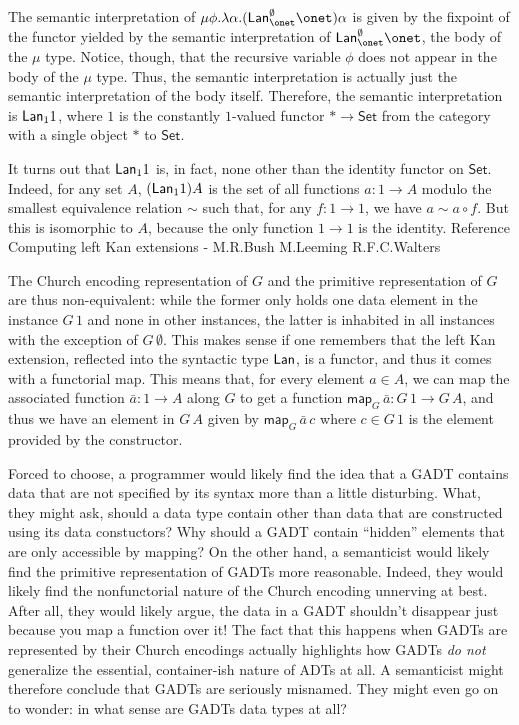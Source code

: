 \documentclass[acmsmall,screen,review,anonymous]{acmart}
\theoremstyle{definition}
\newcommand{\set}{\mathsf{Set}}
\newcommand{\map}{\mathsf{map}}
\begin{document}
\begin{example}
The semantic interpretation of $\mu \phi. \lambda
\alpha. (\Lan^{\emptyset}_{\onet} \onet)\alpha$ is given by the
fixpoint of the functor yielded by the semantic interpretation of
$\Lan^{\emptyset}_{\onet} \onet$, the body of the $\mu$ type.  Notice,
though, that the recursive variable $\phi$ does not appear in the body
of the $\mu$ type.  Thus, the semantic interpretation is actually just
the semantic interpretation of the body itself.  Therefore, the
semantic interpretation is $\mathsf{\mathsf{Lan}}_1 1$, where $1$ is the
constantly $1$-valued functor $\ast \to \set$ from the category with a
single object $\ast$ to $\set$.

It turns out that $\mathsf{\mathsf{Lan}}_1 1$ is, in fact, none other than the
identity functor on $\set$.  Indeed, for any set $A$,
$(\mathsf{\mathsf{Lan}}_1 1) A$ is the set of all functions $a : 1 \to A$
modulo the smallest equivalence relation $\sim$ such that, for any $f
: 1 \to 1$, we have $a \sim a \circ f$.  But this is isomorphic to
$A$, because the only function $1 \to 1$ is the identity.
{\color{blue} Reference Computing left Kan extensions - M.R.Bush
  M.Leeming R.F.C.Walters}

The Church encoding representation of $G$ and the primitive
representation of $G$ are thus non-equivalent: while the former only
holds one data element in the instance $G\,1$ and none in other
instances, the latter is inhabited in all instances with the exception
of $G\,\emptyset$.  This makes sense if one remembers that the left
Kan extension, reflected into the syntactic type $\mathsf{Lan}$, is a functor,
and thus it comes with a functorial map.  This means that, for every
element $a \in A$, we can map the associated function $\bar{a} : 1 \to
A$ along $G$ to get a function $\map_{G}\,\bar{a} : G\,1 \to G\,A$,
and thus we have an element in $G\,A$ given by $\map_{G}\,\bar{a}\, c$
where $c \in G\,1$ is the element provided by the constructor.
\end{example}

Forced to choose, a programmer would likely find the idea that a GADT
contains data that are not specified by its syntax more than a little
disturbing. What, they might ask, should a data type contain other
than data that are constructed using its data constuctors? Why should
a GADT contain ``hidden'' elements that are only accessible by
mapping? On the other hand, a semanticist would likely find the
primitive representation of GADTs more reasonable. Indeed, they would
likely find the nonfunctorial nature of the Church encoding unnerving
at best. After all, they would likely argue, the data in a GADT
shouldn't disappear just because you map a function over it! The fact
that this happens when GADTs are represented by their Church encodings
actually highlights how GADTs {\em do not} generalize the essential,
container-ish nature of ADTs at all. A semanticist might therefore
conclude that GADTs are seriously misnamed. They might even go on to
wonder: in what sense are GADTs data types at all?
\end{document}
